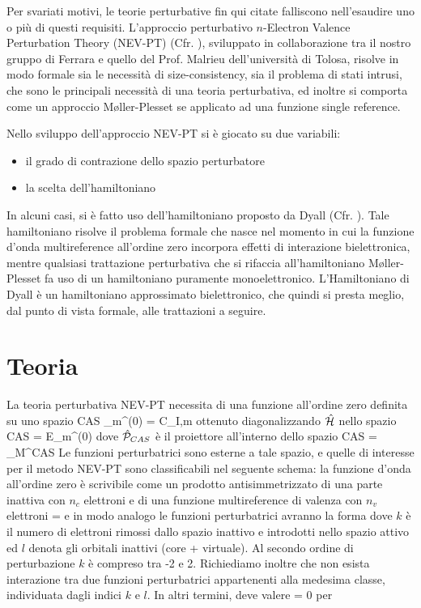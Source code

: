 Per svariati motivi, le teorie perturbative fin qui citate falliscono
nell'esaudire uno o pi\`u di questi requisiti.
L'approccio perturbativo $n$-Electron Valence Perturbation Theory (NEV-PT)
(Cfr. \cite{jcp-114-23-2001-10252}), sviluppato in collaborazione tra il
nostro gruppo di Ferrara e quello del Prof. Malrieu dell'universit\`a di
Tolosa, risolve in modo formale sia le necessit\`a di size-consistency, sia
il problema di stati intrusi, che sono le principali necessit\`a di una
teoria perturbativa, ed inoltre si comporta come un approccio
M{\o}ller-Plesset se applicato ad una funzione
single reference.

Nello sviluppo dell'approccio NEV-PT si \`e giocato su due variabili:
\begin{itemize}
\item il grado di contrazione dello spazio perturbatore
\item la scelta dell'hamiltoniano
\end{itemize}

In alcuni casi, si \`e fatto uso dell'hamiltoniano proposto da Dyall (Cfr.
\cite{jcp-102-1995-4909}). Tale hamiltoniano risolve il problema formale che
nasce nel momento in cui la funzione d'onda multireference all'ordine zero
incorpora effetti di interazione bielettronica, mentre qualsiasi trattazione
perturbativa che si rifaccia all'hamiltoniano M{\o}ller-Plesset fa uso di
un hamiltoniano puramente monoelettronico.
L'Hamiltoniano di Dyall \`e un hamiltoniano approssimato bielettronico, che
quindi si presta meglio, dal punto di vista formale, alle trattazioni a
seguire.

\section{Teoria}

La teoria perturbativa NEV-PT necessita di una funzione all'ordine zero
definita su uno spazio CAS
\beq
\Psi_m^{(0)} =  C_{I,m} 
\eeq
ottenuto diagonalizzando $\hat{\mathcal{H}}$ nello spazio CAS
\beq
{}\ham{} = E_m^{(0)} 
\eeq
dove $\hat{\mathcal{P}}_{CAS}$ \`e il proiettore all'interno dello spazio CAS
\beq
{} = \sum_{M}^{\mbox{CAS}}  
\eeq
Le funzioni perturbatrici sono esterne a tale spazio, e quelle di interesse
per il metodo NEV-PT sono classificabili nel seguente schema: la funzione
d'onda all'ordine zero \`e scrivibile come un prodotto antisimmetrizzato di
una parte inattiva con $n_c$ elettroni e di una funzione
multireference di valenza con $n_v$ elettroni
\beq
{} = 
\eeq
e in modo analogo le funzioni perturbatrici avranno la forma
\beq
{}
\eeq
dove $k$ \`e il numero di elettroni rimossi dallo spazio inattivo e
introdotti nello spazio attivo ed $l$ denota gli orbitali inattivi (core + virtuale).
Al secondo ordine di perturbazione $k$ \`e
compreso tra -2 e 2.
Richiediamo inoltre che non esista interazione tra due funzioni
perturbatrici appartenenti alla medesima classe, individuata dagli indici
$k$ e $l$. In altri termini, deve valere
\beq
{} =
0 \qquad \mbox{per }\mu \neq \nu
\eeq

